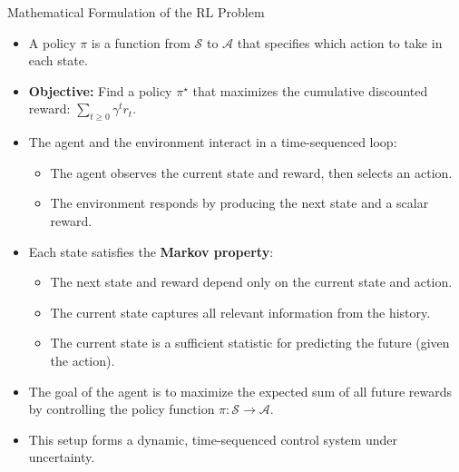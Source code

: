 \begin{frame}[allowframebreaks]{Mathematical Formulation of the RL Problem}
\begin{itemize}
\begin{itemize}
            \item The environment samples reward $r_t \sim R(\cdot|s_t, a_t)$.
            \item The environment samples the next state $s_{t+1} \sim P(\cdot|s_t, a_t)$.
            \item The agent receives reward $r_t$ and next state $s_{t+1}$.
        \end{itemize}
        \item A policy $\pi$ is a function from $\mathcal{S}$ to $\mathcal{A}$ that specifies which action to take in each state.
        \item \textbf{Objective:} Find a policy $\pi^\star$ that maximizes the cumulative discounted reward: $\sum_{t \geq 0} \gamma^t r_t$.
    \end{itemize}
\framebreak
    \begin{itemize}
        \item The agent and the environment interact in a time-sequenced loop:
        \begin{itemize}
            \item The agent observes the current state and reward, then selects an action.
            \item The environment responds by producing the next state and a scalar reward.
        \end{itemize}
        \item Each state satisfies the \textbf{Markov property}:
        \begin{itemize}
            \item The next state and reward depend only on the current state and action.
            \item The current state captures all relevant information from the history.
            \item The current state is a sufficient statistic for predicting the future (given the action).
        \end{itemize}
        \item The goal of the agent is to maximize the expected sum of all future rewards by controlling the policy function $\pi: \mathcal{S} \rightarrow \mathcal{A}$.
        \item This setup forms a dynamic, time-sequenced control system under uncertainty.
\end{itemize}
\end{frame}

